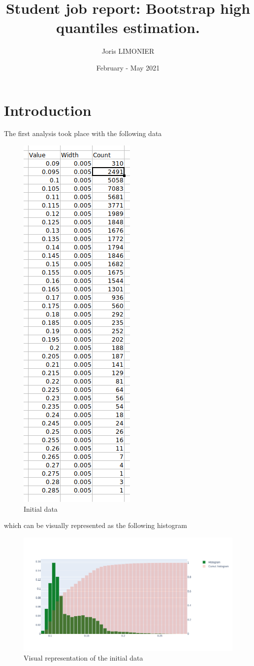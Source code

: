 \documentclass{article}
\title{Student job report: Bootstrap high quantiles estimation.}
\author{Joris LIMONIER}
\date{February - May 2021}
\begin{document}
\maketitle

\section{Introduction}
The first analysis took place with the following data

\begin{figure}[H]
    \centering
    \includegraphics[width=.28\textwidth]{images/excel_data.png}
    \caption{Initial data}
\end{figure}

which can be visually represented as the following histogram

\begin{figure}[H]
    \centering
    \includegraphics[width=\textwidth]{images/plot_excel_data.png}
    \caption{Visual representation of the initial data}
\end{figure}
\end{document}
